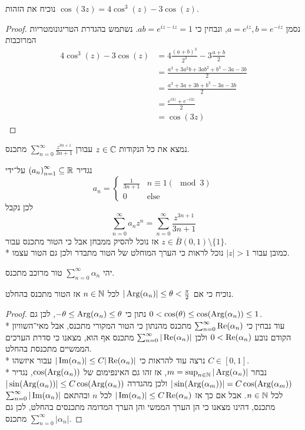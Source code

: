 \Subquestion{}
נוכיח את הזהות $\cos(3z) = 4\cos^3(z) - 3 \cos(z)$.
\begin{proof}
	נסמן $a = e^{iz}, b = e^{-iz}$, ונבחין כי $ab = e^{iz - iz} = 1$.
	נשתמש בהגדרת הטריגונומטריות המרוכבות
	\begin{align*}
		4\cos^3(z) - 3 \cos(z)
		& = 4 \frac{{(a + b)}^3}{2^3} - 3 \frac{a + b}{2} \\
		& = \frac{a^3 + 3 a^2 b + 3 a b^2 + b^3 - 3a - 3b}{2} \\
		& = \frac{a^3 + 3 a + 3 b + b^3 - 3a - 3b}{2} \\
		& = \frac{e^{i 3z} + e^{-i 3z}}{2} \\
		& = \cos(3z)
	\end{align*}
\end{proof}

\Question{}
נמצא את כל הנקודות $z \in \mathbb{C}$ עבורן $\sum_{n = 0}^\infty \frac{z^{3n + 1}}{3n + 1}$ מתכנס.
\begin{solution}
	נגדיר ${(a_n)}_{n = 1}^\infty \subseteq \mathbb{R}$ על־ידי
	\[
		a_n = \begin{cases}
			\frac{1}{3n + 1} & n \equiv 1 (\mod 3) \\
			0 & \text{else}
		\end{cases}
	\]
	לכן נקבל
	\[
		\sum_{n = 0}^\infty a_n z^n
		= \sum_{n = 0}^\infty \frac{z^{3n + 1}}{3n + 1}
	\]
	אז נוכל להסיק ממבחן אבל כי הטור מתכנס עבור $z \in \overline{B}(0, 1) \setminus \{1\}$. \\*
	כמובן עבור $|z| > 1$ נוכל לראות כי הערך המוחלט של הטור מתבדר ולכן גם הטור עצמו.
\end{solution}

\Question{}
יהי $\sum_{n = 0}^\infty \alpha_n$ טור מרוכב מתכנס.

\Subquestion{}
נוכיח כי אם $|\operatorname{Arg}(\alpha_n)| \le \theta < \frac{\pi}{2}$ לכל $n \in \mathbb{N}$ אז הטור מתכנס בהחלט.
\begin{proof}
	נתון כי $-\theta \le \operatorname{Arg}(\alpha_n) \le \theta$, לכן גם $0 < \cos(\theta) \le \cos(\operatorname{Arg}(\alpha_n)) \le 1$. \\*
	עוד נבחין כי $\sum_{n = 0}^\infty \operatorname{Re}(\alpha_n)$ מתכנס מהנתון כי הטור המקורי מתכנס, אבל מאי־השוויון הקודם נובע $0 < \operatorname{Re}(\alpha_n)$ ולכן $\sum_{n = 0}^{\infty} |\operatorname{Re}(\alpha_n)|$ מתכנס אף הוא,
	מצאנו כי סדרת הערכים הממשיים מתכנסת בהחלט. \\*
	נרצה עוד להראות כי $|\operatorname{Im}(\alpha_n)| \le C |\operatorname{Re}(\alpha_n)|$ עבור איזשהו $C \in [0, 1]$. \\*
	נבחר $m = \sup_{n \in \mathbb{N}} |\operatorname{Arg}(\alpha_n)|$, אז זהו גם האינפימום של $\cos(\operatorname{Arg}(\alpha_n))$,
	נגדיר $|\sin(\operatorname{Arg}(\alpha_m))| = C \cos(\operatorname{Arg}(\alpha_m))$ ולכן מהגדרה $|\sin(\operatorname{Arg}(\alpha_n))| \le C \cos(\operatorname{Arg}(\alpha_n))$ לכל $n \in \mathbb{N}$.
	אבל אם כך אז $|\operatorname{Im}(\alpha_n)| \le C \operatorname{Re}(\alpha_n)$ לכל $n$ ובהתאם $\sum_{n = 0}^{\infty} |\operatorname{Im}(\alpha_n)|$ מתכנס, דהינו מצאנו כי הן הערך הממשי והן הערך המדומה מתכנסים בהחלט, לכן גם $\sum_{n = 0}^{\infty} |\alpha_n|$ מתכנס.
\end{proof}

